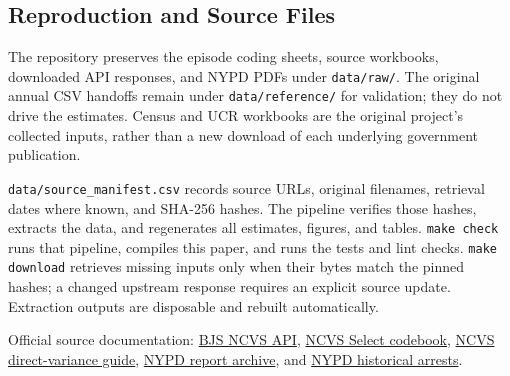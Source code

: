 \subsection*{Reproduction and Source Files}
The repository preserves the episode coding sheets, source workbooks, downloaded API responses, and NYPD PDFs under \texttt{data/raw/}. The original annual CSV handoffs remain under \texttt{data/reference/} for validation; they do not drive the estimates. Census and UCR workbooks are the original project's collected inputs, rather than a new download of each underlying government publication.

\texttt{data/source\_manifest.csv} records source URLs, original filenames, retrieval dates where known, and SHA-256 hashes. The pipeline verifies those hashes, extracts the data, and regenerates all estimates, figures, and tables. \texttt{make check} runs that pipeline, compiles this paper, and runs the tests and lint checks. \texttt{make download} retrieves missing inputs only when their bytes match the pinned hashes; a changed upstream response requires an explicit source update. Extraction outputs are disposable and rebuilt automatically.

Official source documentation: \href{https://bjs.ojp.gov/national-crime-victimization-survey-ncvs-api}{BJS NCVS API}, \href{https://bjs.ojp.gov/document/NCVS_Select_person_level_codebook.pdf}{NCVS Select codebook}, \href{https://bjs.ojp.gov/sites/g/files/xyckuh236/files/media/document/ncvs_variance_user_guide_11.06.14.pdf}{NCVS direct-variance guide}, \href{https://www.nyc.gov/site/nypd/stats/reports-analysis/archive.page}{NYPD report archive}, and \href{https://data.cityofnewyork.us/Public-Safety/NYPD-Arrests-Data-Historic-/8h9b-rp9u}{NYPD historical arrests}.

\endgroup
